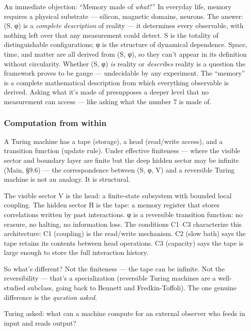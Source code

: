 \documentclass[
]{article}
\begin{document}
An immediate objection: ``Memory made of \emph{what}?'' In everyday
life, memory requires a physical substrate --- silicon, magnetic
domains, neurons. The answer: (S, φ) is a \emph{complete description} of
reality --- it determines every observable, with nothing left over that
any measurement could detect. S is the totality of distinguishable
configurations; φ is the structure of dynamical dependence. Space, time,
and matter are all derived from (S, φ), so they can't appear in its
definition without circularity. Whether (S, φ) \emph{is} reality or
\emph{describes} reality is a question the framework proves to be gauge
--- undecidable by any experiment. The ``memory'' is a complete
mathematical description from which everything observable is derived.
Asking what it's made of presupposes a deeper level that no measurement
can access --- like asking what the number 7 is made of.

\hypertarget{computation-from-within}{%
\subsubsection{Computation from within}\label{computation-from-within}}

A Turing machine has a tape (storage), a head (read/write access), and a
transition function (update rule). Under effective finiteness --- where
the visible sector and boundary layer are finite but the deep hidden
sector may be infinite (Main, §9.6) --- the correspondence between (S,
φ, V) and a reversible Turing machine is not an analogy. It is
structural.

The visible sector V is the head: a finite-state subsystem with bounded
local coupling. The hidden sector H is the tape: a memory register that
stores correlations written by past interactions. φ is a reversible
transition function: no erasure, no halting, no information loss. The
conditions C1--C3 characterize this architecture: C1 (coupling) is the
read/write mechanism. C2 (slow bath) says the tape retains its contents
between head operations. C3 (capacity) says the tape is large enough to
store the full interaction history.

So what's different? Not the finiteness --- the tape can be infinite.
Not the reversibility --- that's a specialization (reversible Turing
machines are a well-studied subclass, going back to Bennett and
Fredkin-Toffoli). The one genuine difference is the \emph{question
asked}.

Turing asked: what can a machine compute for an external observer who
feeds in input and reads output?
\end{document}
